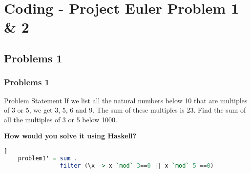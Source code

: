 \section{Coding - Project Euler Problem 1 & 2}
\frame{\sectionpage}

\subsection{Problems 1}
	
\begin{frame}[fragile]\frametitle{Problems 1}


\begin{block}{Problem Statement}
			If we list all the natural numbers below 10 that are multiples of
			 3 or 5, we get 3, 5, 6 and 9. The sum of these multiples is 23.
			Find the sum of all the multiples of 3 or 5 below 1000.
\end{block}	
\pause
{\centering
\textbf{How would you solve it using Haskell?}}\pause
	 \begin{lstlisting}[language=Haskell,basicstyle=\footnotesize\ttfamily]]
	problem1' = sum . 
	            filter (\x -> x `mod` 3==0 || x `mod` 5 ==0)
	\end{lstlisting}
\end{frame}